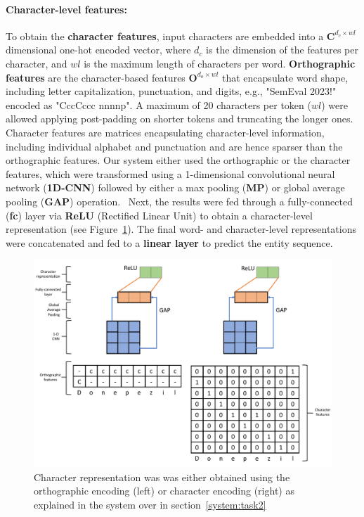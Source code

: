 \documentclass[11pt]{article}
\begin{document}
\paragraph{Character-level features: } 
%
To obtain the \textbf{character features}, input characters are embedded into a $\mathbf{C}^{d_{c} \times wl}$ dimensional one-hot encoded vector, where $d_{c}$ is the dimension of the features per character, and $wl$ is the maximum length of characters per word.
\textbf{Orthographic features} are the character-based features $\mathbf{O}^{d_{o} \times wl}$ that encapsulate word shape, including letter capitalization, punctuation, and digits, e.g., "SemEval 2023!" encoded as "CccCccc nnnnp". 
A maximum of 20 characters per token ($wl$) were allowed applying post-padding on shorter tokens and truncating the longer ones.
Character features are matrices encapsulating character-level information, including individual alphabet and punctuation and are hence sparser than the orthographic features.
Our system either used the orthographic or the character features, which were transformed using a 1-dimensional convolutional neural network (\textbf{1D-CNN}) followed by either a max pooling (\textbf{MP}) or global average pooling (\textbf{GAP}) operation.~\cite{zhou2016learning}
Next, the results were fed through a fully-connected (\textbf{fc}) layer via \textbf{ReLU} (Rectified Linear Unit) to obtain a character-level representation (see Figure~\ref{fig:task2_char}).
The final word- and character-level representations were concatenated and fed to a \textbf{linear layer} to predict the entity sequence.
%
%
%
\begin{figure}[!htbp]
    \centering
    \includegraphics[width=\columnwidth]{figures/word_arch2.pdf}
    \caption{Character representation was was either obtained using the orthographic encoding (left) or character encoding (right) as explained in the system over in section~\ref{system:task2}}
    \label{fig:task2_char}
\end{figure}
%
%
%
\end{document}
